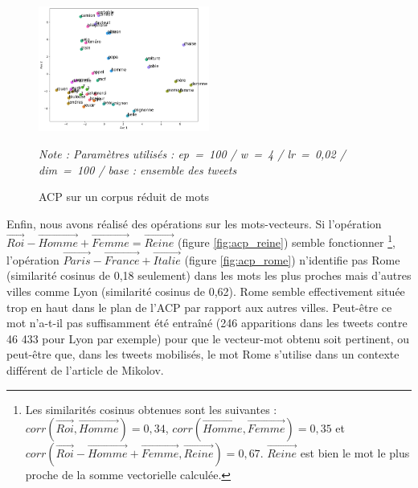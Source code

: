 \documentclass[11pt,french,french]{article}
\let\rmarkdownfootnote\footnote%
\def\footnote{\protect\rmarkdownfootnote}
\begin{document}
\begin{figure}
\begin{center}
\includegraphics[width=0.5\textwidth]{img/acp_gensim.png}
\captionsetup{margin=0cm,format=hang,justification=justified}
\caption{ACP sur un corpus réduit de mots}\label{fig:acp_gensim}
\end{center}
\vspace{-0.3cm}
\footnotesize
\emph{Note : Paramètres utilisés : ep = 100 / w = 4 / lr = 0,02 / dim = 100 / base : ensemble des tweets }
\end{figure}

Enfin, nous avons réalisé des opérations sur les mots-vecteurs. Si
l'opération
\(\overrightarrow{Roi} - \overrightarrow{Homme} + \overrightarrow{Femme} = \overrightarrow{Reine}\)
(figure \ref{fig:acp_reine}) semble fonctionner \footnote{Les
  similarités cosinus obtenues sont les suivantes :
  \(corr(\overrightarrow{Roi}, \overrightarrow{Homme}) = 0,34\),
  \(corr(\overrightarrow{Homme}, \overrightarrow{Femme}) = 0,35\) et
  \(corr(\overrightarrow{Roi} - \overrightarrow{Homme} + \overrightarrow{Femme} , \overrightarrow{Reine}) = 0,67\).
  \(\overrightarrow{Reine}\) est bien le mot le plus proche de la somme
  vectorielle calculée.}, l'opération
\(\overrightarrow{Paris} - \overrightarrow{France} + \overrightarrow{Italie}\)
(figure \ref{fig:acp_rome}) n'identifie pas \og Rome \fg{}(similarité
cosinus de 0,18 seulement) dans les mots les plus proches mais d'autres
villes comme \og Lyon \fg{} (similarité cosinus de 0,62). \og Rome \fg{}
semble effectivement située \og trop en haut\fg{} dans le plan de l'ACP
par rapport aux autres villes. Peut-être ce mot n'a-t-il pas
suffisamment été entraîné (246 apparitions dans les tweets contre 46 433
pour Lyon par exemple) pour que le vecteur-mot obtenu soit pertinent, ou
peut-être que, dans les tweets mobilisés, le mot \og Rome \fg{}
s'utilise dans un contexte différent de l'article de Mikolov.
\end{document}
